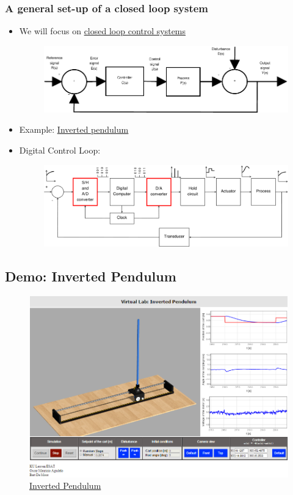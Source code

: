 \begin{frame}
	\frametitle{A general set-up of a closed loop system}
	\vspace*{-1em}
	\begin{itemize}
		\item We will focus on \underline{closed loop control systems}
		\begin{figure}
\centering
\includegraphics[width=0.7\linewidth]{Closed-Loop}
\label{fig:Closed-Loop}
\end{figure}
\item Example: \href{http://homes.esat.kuleuven.be/~magudelo/_html5/test11.html}{\underline{Inverted pendulum}}

\item Digital Control Loop:
\begin{figure}
\centering
\includegraphics[width=0.6\linewidth]{digital-control-system}
\label{fig:digital-control-system}
\end{figure}

	\end{itemize}
\end{frame}

\subsection[Demo: Inverted Pendulum]{Demo: Inverted Pendulum}
\begin{frame}
	\begin{figure}
\centering
\includegraphics[width=0.7\linewidth]{"Inverted Pendulum"}
\caption{\href{http://homes.esat.kuleuven.be/~magudelo/_html5/test11.html}{{Inverted Pendulum}}}
\label{fig:InvertedPendulum}
\end{figure}
\end{frame}

